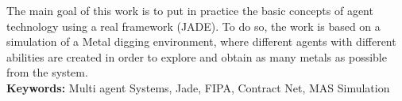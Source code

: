 The main goal of this work is to put in practice the basic concepts of agent technology using a real framework (JADE). To do so, the work is based on a simulation of a Metal digging environment, where different agents with different abilities are created in order to explore and obtain as many metals as possible from the system.
\\ 
{\bf Keywords:} Multi agent Systems, Jade, FIPA, Contract Net, MAS Simulation
